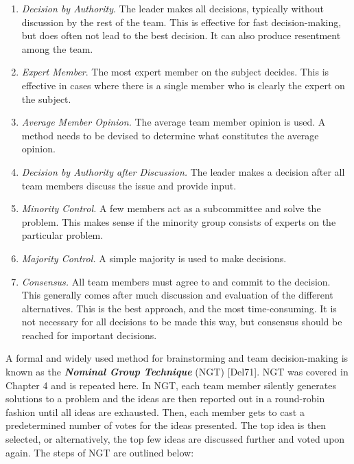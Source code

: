 \begin{enumerate}
\def\labelenumi{\arabic{enumi}.}
\item
  \emph{Decision by Authority}. The leader makes all decisions,
  typically without discussion by the rest of the team. This is
  effective for fast decision-making, but does often not lead to the
  best decision. It can also produce resentment among the team.
\item
  \emph{Expert Member}. The most expert member on the subject decides.
  This is effective in cases where there is a single member who is
  clearly the expert on the subject.
\item
  \emph{Average Member Opinion.} The average team member opinion is
  used. A method needs to be devised to determine what constitutes the
  average opinion.
\item
  \emph{Decision by Authority after Discussion.} The leader makes a
  decision after all team members discuss the issue and provide input.
\item
  \emph{Minority Control.} A few members act as a subcommittee and solve
  the problem. This makes sense if the minority group consists of
  experts on the particular problem.
\item
  \emph{Majority Control.} A simple majority is used to make decisions.
\item
  \emph{Consensus.} All team members must agree to and commit to the
  decision. This generally comes after much discussion and evaluation of
  the different alternatives. This is the best approach, and the most
  time-consuming. It is not necessary for all decisions to be made this
  way, but consensus should be reached for important decisions.
\end{enumerate}

A formal and widely used method for brainstorming and team
decision-making is known as the \emph{\textbf{Nominal Group Technique}}
(NGT) {[}Del71{]}. NGT was covered in Chapter 4 and is repeated here. In
NGT, each team member silently generates solutions to a problem and the
ideas are then reported out in a round-robin fashion until all ideas are
exhausted. Then, each member gets to cast a predetermined number of
votes for the ideas presented. The top idea is then selected, or
alternatively, the top few ideas are discussed further and voted upon
again. The steps of NGT are outlined below:


